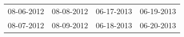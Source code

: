\begin{supertabular}{llll}
 08-06-2012 &  08-08-2012 &  06-17-2013 &  06-19-2013 \\
 08-07-2012 &  08-09-2012 &  06-18-2013 &  06-20-2013 \\
\end{supertabular}
